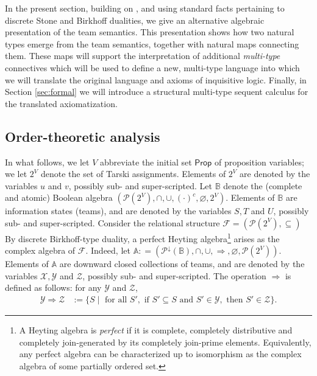 In the present section, building on \cite{AbramskyVaananen08, Roelofsen_algebraic_13}, and using standard facts pertaining to discrete Stone and Birkhoff dualities, we give an alternative algebraic presentation of the team semantics. This presentation shows how two natural types emerge from the team semantics, together with natural maps connecting them. These maps will  support the interpretation of additional {\em multi-type} connectives which will be used to define a new, multi-type language into which we will translate the original language and axioms of inquisitive logic. Finally, in Section \ref{sec:formal} we will introduce a structural  multi-type sequent calculus for the translated axiomatization.

\subsection{Order-theoretic analysis}
\label{ssec:semanticanalysis}





In what follows, we let $V$ abbreviate the initial set $\mathsf{Prop}$ of proposition variables; we let $2^V$ denote the set of Tarski assignments. Elements of $2^V$ are denoted by the variables $u$ and $v$, possibly sub- and super-scripted. Let $\mathbb{B}$ denote the (complete and atomic) Boolean algebra $(\mathcal{P}(2^V), \cap, \cup, (\cdot)^c,\varnothing, 2^V)$. Elements of $\mathbb{B}$ are information states (teams), and are denoted by the variables $S, T$ and $U$, possibly sub- and super-scripted. Consider the relational structure $\mathcal{F} = (\mathcal{P}(2^V), \subseteq)$
By discrete Birkhoff-type duality, a perfect Heyting algebra\footnote{A Heyting algebra is {\em perfect} if it is complete, completely distributive and completely join-generated by its completely join-prime elements. Equivalently, any perfect algebra can be characterized up to isomorphism as the complex algebra of some partially ordered set.} arises as the complex algebra of $\mathcal{F}$. Indeed,
let $\mathbb{A}: = (\mathcal{P}^{\downarrow}(\mathbb{B}), \cap, \cup, \Rightarrow, \varnothing, \mathcal{P}(2^V))$. Elements of $\mathbb{A}$ are downward closed collections of teams, and are denoted by the variables $\mathcal{X}, \mathcal{Y}$ and $\mathcal{Z}$, possibly sub- and super-scripted. The operation $\Rightarrow$ is defined as follows: for any $\mathcal{Y}$ and $\mathcal{Z}$,
\begin{align*}
\mathcal{Y}\Rightarrow\mathcal{Z} & := \{S\mid \mbox{ for all } S', \mbox{ if } S'\subseteq S \mbox{ and } S'\in \mathcal{Y}, \mbox{ then } S'\in \mathcal{Z}\}.
\end{align*}








